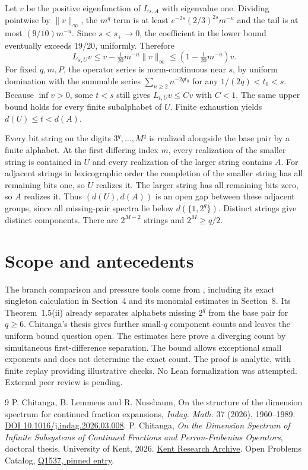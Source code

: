 \documentclass[11pt,a4paper]{amsart}
\begin{document}
Let $v$ be the positive eigenfunction of $L_{s,A}$ with eigenvalue one. Dividing pointwise by $\|v\|_\infty$, the $m^q$ term is at least $e^{-2s}(2/3)^{2s}m^{-u}$ and the tail is at most $(9/10)m^{-u}$. Since $s<s_+\to0$, the coefficient in the lower bound eventually exceeds $19/20$, uniformly. Therefore
\[
L_{s,U}v\le v-\tfrac1{20}m^{-u}\|v\|_\infty
             \le (1-\tfrac1{20}m^{-u})v.
\]
For fixed $q,m,P$, the operator series is norm-continuous near $s$, by uniform domination with the summable series $\sum_{n\ge2}n^{-2qt_0}$ for any $1/(2q)<t_0<s$. Because $\inf v>0$, some $t<s$ still gives $L_{t,U}v\le C v$ with $C<1$. The same upper bound holds for every finite subalphabet of $U$. Finite exhaustion yields $d(U)\le t<d(A)$.

Every bit string on the digits $3^q,\ldots,M^q$ is realized alongside the base pair by a finite alphabet. At the first differing index $m$, every realization of the smaller string is contained in $U$ and every realization of the larger string contains $A$. For adjacent strings in lexicographic order the completion of the smaller string has all remaining bits one, so $U$ realizes it. The larger string has all remaining bits zero, so $A$ realizes it. Thus $(d(U),d(A))$ is an open gap between these adjacent groups, since all missing-pair spectra lie below $d(\{1,2^q\})$. Distinct strings give distinct components. There are $2^{M-2}$ strings and $2^M\ge q/2$.

\section{Scope and antecedents}
The branch comparison and pressure tools come from \cite{cln}, including its exact singleton calculation in Section~4 and its monomial estimates in Section~8. Its Theorem~1.5(ii) already separates alphabets missing $2^q$ from the base pair for $q\ge6$. Chitanga's thesis \cite{thesis} gives further small-$q$ component counts and leaves the uniform bound question open. The estimates here prove a diverging count by simultaneous first-difference separation. The bound allows exceptional small exponents and does not determine the exact count. The proof is analytic, with finite replay providing illustrative checks. No Lean formalization was attempted. External peer review is pending.

\begin{thebibliography}{9}
 P. Chitanga, B. Lemmens and R. Nussbaum, On the structure of the dimension spectrum for continued fraction expansions, \emph{Indag. Math.} 37 (2026), 1960--1989. \href{https://doi.org/10.1016/j.indag.2026.03.008}{DOI 10.1016/j.indag.2026.03.008}.
 P. Chitanga, \emph{On the Dimension Spectrum of Infinite Subsystems of Continued Fractions and Perron-Frobenius Operators}, doctoral thesis, University of Kent, 2026. \href{https://kar.kent.ac.uk/114012/}{Kent Research Archive}.
 Open Problems Catalog, \href{https://github.com/10m-u/open-problems-catalog/blob/ca8d4d44ba3db527f19f28928c240168f545ecfe/problems/mathematics/differential-equations-dynamical-systems.md\#q1537}{Q1537, pinned entry}.
\end{thebibliography}
\end{document}
